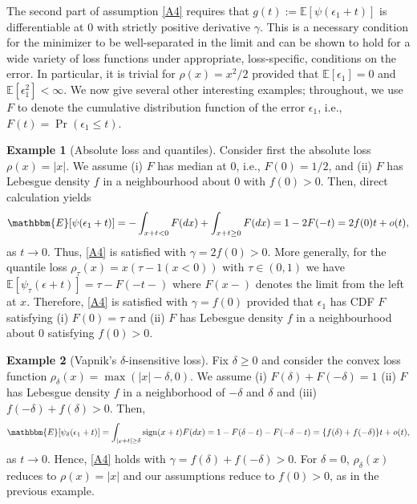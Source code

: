 \documentclass[11pt]{article}
\theoremstyle{definition}
\newtheorem{lossexampleinner}{Example}
\newenvironment{lossexample}
  {\begin{lossexampleinner}}
  {\end{lossexampleinner}}
\theoremstyle{remark}
\DeclareMathOperator{\sign}{sign}
\begin{document}
The second part of assumption \ref{A4} requires that $g(t) := \mathbb{E}[\psi(\epsilon_1+t)]$ is differentiable at $0$ with strictly positive derivative $\gamma$. This is a necessary condition for the minimizer to be well-separated in the limit and can be shown to hold for a wide variety of loss functions under appropriate, loss-specific, conditions on the error. In particular, it is trivial for $\rho(x) = x^2/2$ provided that $\mathbb{E}[\epsilon_1]=0$ and $\mathbb{E}[\epsilon_1^2] < \infty$. We now give several other interesting examples; throughout, we use $F$ to denote the cumulative distribution function of the error $\epsilon_1$, i.e., $F(t) = \Pr(\epsilon_1 \leq t)$.

\begin{lossexample}[Absolute loss and quantiles]
Consider first the absolute loss $\rho(x) = |x|$. We assume (i) $F$ has median at $0$, i.e., $F(0)=1/2$, and (ii) $F$ has Lebesgue density $f$ in a neighbourhood about $0$ with $f(0)>0$. Then, direct calculation yields
\begin{align*}
\mathbbm{E}[\psi(\epsilon_1+t)] = -\int_{x+t <0} F(dx) + \int_{x+t \geq 0}  F(dx) = 1-2F(-t) = 2f(0)t + o(t),
\end{align*}
as $t \to 0$. Thus, \ref{A4} is satisfied with $\gamma = 2 f(0)>0$. More generally, for the quantile loss $\rho_{\tau}(x) = x(\tau-1(x<0))$ with $\tau \in (0,1)$ we have $\mathbb{E}[\psi_{\tau}(\epsilon+t)] = \tau - F(-t-)$ where $F(x-)$ denotes the limit from the left at $x$. Therefore, \ref{A4} is satisfied with $\gamma = f(0)$ provided that $\epsilon_1$ has CDF $F$ satisfying (i) $F(0) = \tau$ and (ii) $F$ has Lebesgue density $f$ in a neighbourhood about $0$ satisfying $f(0)>0$.
\end{lossexample}

\begin{lossexample}[Vapnik's $\delta$-insensitive loss]
Fix $\delta \geq 0$ and consider the convex loss function $\rho_{\delta}(x) = \max(|x|-\delta,0)$. We assume (i) $F(\delta) + F(-\delta) = 1$ (ii) $F$ has Lebesgue density $f$ in a neighborhood of $-\delta$ and $\delta$ and (iii) $f(-\delta)+f(\delta)>0$. Then,
\begin{align*}
\mathbbm{E}[\psi_{\delta}(\epsilon_1+t)] = \int_{|x+t| \geq \delta} \sign(x+t) F(dx) = 1-F(\delta-t) - F(-\delta-t) = \{f(\delta)+f(-\delta)\} t + o(t),
\end{align*}
as $t \to 0$. Hence, \ref{A4} holds with $\gamma = f(\delta) + f(-\delta)>0$. For $\delta = 0$, $\rho_{\delta}(x)$ reduces to $\rho(x) = |x|$ and our assumptions reduce to $f(0)>0$, as in the previous example.
\end{lossexample}
\end{document}
